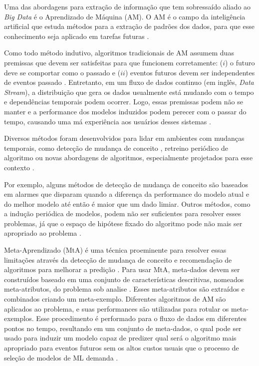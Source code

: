 Uma das abordagens para extração de informação que tem sobressaído aliado ao \textit{Big Data} é o Aprendizado de Máquina (AM). O AM é o campo da inteligência artificial que estuda métodos para a extração de padrões dos dados, para que esse conhecimento seja aplicado em tarefas futuras \cite{mitchell1997machine,friedman2001elements}.

Como todo método indutivo, algoritmos tradicionais de AM assumem duas premissas que devem ser satisfeitas para que funcionem corretamente: ($i$) o futuro deve se comportar como o passado e ($ii$) eventos futuros devem ser independentes de eventos passado \cite{vapnik2013nature}. Entretanto, em um fluxo de dados continuo (em inglês, \textit{Data Stream}), a distribuição que gera os dados usualmente está mudando com o tempo e dependências temporais podem ocorrer. Logo, essas premissas podem não se manter e a performance dos modelos induzidos podem perecer com o passar do tempo, causando uma má experiência aos usuários desses sistemas  \cite{gama2007learning, Johansson2014}.

Diversos métodos foram desenvolvidos para lidar em ambientes com mudanças temporais, como detecção de mudança de conceito \cite{klinkenberg2000detecting}, retreino periódico de algoritmo \cite{bifet2007learning} ou novas abordagens de algoritmos, especialmente projetados para esse contexto \cite{zang2014comparative}.

Por exemplo, alguns métodos de detecção de mudança de conceito \cite{gama2010knowledge} são baseados em alarmes que disparam quando a diferença da performance do modelo atual e do melhor modelo até então é maior que um dado limiar. Outros métodos, como a indução periódica de modelos, podem não ser suficientes para resolver esses problemas, já que o espaço de hipótese fixado do algoritmo pode não mais ser apropriado ao problema \cite{rossi2014metastream}.

Meta-Aprendizado (MtA) é uma técnica proeminente para resolver essas limitações através da detecção de mudança de conceito e recomendação de algoritmos para melhorar a predição \cite{Anderson2019,VanRijn2016,Zarmehri2015}. Para usar MtA, meta-dados devem ser construídos \cite{Vanschoren2018} baseado em uma conjunto de características descritivas, nomeados meta-atributos, do problema sob analise \cite{Rivolli2018}. Esses meta-atributos são extraídos e combinados criando um meta-exemplo. Diferentes algoritmos de AM são aplicados ao problema, e suas performances são utilizadas para rotular os meta-exemplos. Esse procedimento é performado para o fluxo de dados em diferentes pontos no tempo, resultando em um conjunto de meta-dados, o qual pode ser usado para induzir um modelo capaz de predizer qual será o algoritmo mais apropriado para eventos futuros sem os altos custos usuais que o processo de seleção de modelos de ML demanda \cite{Munoz2018}.

